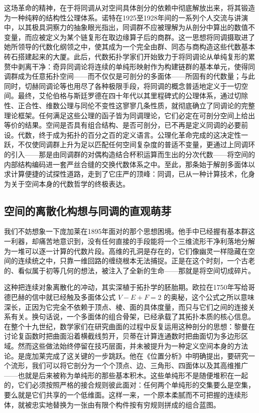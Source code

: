 \documentclass[12pt,a4paper]{article}
\begin{document}
这场革命的精神，在于将同调从对空间具体剖分的依赖中彻底解放出来，将其锻造为一种纯粹的结构性公理体系。诺特在1925至1928年间的一系列个人交流与讲演中，以其极具洞察力的抽象眼光指出，同调群不应被理解为从剖分中算出的数值不变量，而应被定义为某个链复形在取边缘算子后的商群。这一思想将同调摄取进了她所领导的代数化纲领之中，使其成为一个完全由群、同态与商构造这些代数基本砖石搭建起来的大厦。此后，代数拓扑学家们开始致力于将同调论从单纯复形的累赘中剥离干净：奇异同调论将连续的单纯形映射作为构建链群的基本单元，使得同调群成为任意拓扑空间——而不仅仅是可剖分的多面体——所固有的代数量；与此同时，切赫同调论等也用尽了各种极限手段，将同调的概念普适地定义于一切空间。最终，艾伦伯格与斯廷罗德在四十年代以其里程碑式的公理体系，通过切除性、正合性、维数公理与同伦不变性这寥寥几条性质，就彻底确立了同调论的完整理论框架。任何满足这些公理的函子皆为同调理论，它们必定在可剖分空间上给出等价的结果。空间是否具有组合结构、是否可剖分，已不再是定义同调的必要前设。代数，终于成为拓扑的百分之百的定义语言。公理化革命完成的这决定性一跃，不仅使同调群上升为足以匹配任何空间复杂度的普适不变量，更通过上同调环的引入——那是由同调群的对偶构造结合杯积运算而生出的分次代数——将空间的内部结构编码进一套严丝合缝的交换代数体系之中。至此，那条始于解剖多面体以求计算便捷的试探性道路，走到了它庄严的顶峰：同调，已从一种计算技术，化身为关于空间本身的代数哲学的终极表达。

\subsection{空间的离散化构想与同调的直观萌芽}

我们不妨想象一下庞加莱在1895年面对的那个思想困境。他手中已经握有基本群这一利器，却痛苦地意识到，没有任何直接的手段能将一个三维流形干净利落地分解为一堆可以逐一计算的代数片段。高维的孔洞是存在的，它们像幽灵一样隐藏在空间的连续统之中，只靠一维回路的缠绕根本无法捕捉。正是在这个时刻，一个古老的、看似属于初等几何的想法，被注入了全新的生命——那就是将空间切成碎片。

这种把连续对象离散化的冲动，其实深植于拓扑学的胚胎期。欧拉在1750年写给哥德巴赫的信中就已经触及多面体公式 $V-E+F=2$ 的奥秘，这个公式之所以意味深长，正因为它完全不依赖于顶点、棱、面的具体度量，而只与它们之间的连接关系有关。换句话说，一个多面体的组合骨架，已经承载了其拓扑本质的核心信息。在整个十九世纪，数学家们在研究曲面的过程中反复运用这种剖分的思想：黎曼在讨论复函数时把曲面沿着横截线剪开，贝蒂在计算连通数时把曲面切为多边形区域。然而这些做法始终停留在技巧层面，并未被提升为一种定义空间本身的方法论。是庞加莱完成了这关键的一步跳跃。他在《位置分析》中明确提出，要研究一个流形，我们可以将它剖分为一个个顶点、边、三角形、四面体以及其高维推广——也就是后来被称为单纯形的那些基本积木。这些单纯形不是随便堆积在一起的，它们必须按照严格的接合规则彼此面对：任何两个单纯形的交集要么是空集，要么就是它们共享的一个低维面。这样一来，一个原本柔腻而不可把握的连续形体，就被忠实地替换为一张由有限个构件按有穷规则拼成的组合蓝图。
\end{document}
